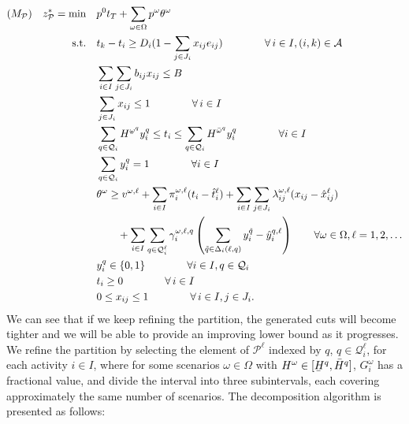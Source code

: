 \documentclass[11pt]{article}
\renewcommand{\underbar}{\underaccent{\bar}}
\begin{document}
	\begin{subequations} \label{prob:masterTightened}
		\begin{align}
		(M_{\mathcal{P}}) \quad z_{\mathcal{P}}^* = \min \quad &p^0 t_T + \sum_{\omega \in \Omega} p^\omega \theta^{\omega}\\
		\text{s.t.} \quad & t_k - t_i \geq D_{i}(1 - \sum_{j \in J_i} x_{ij} e_{ij}) \qquad \qquad \forall \,i \in I, (i,k) \in \mathcal{A} \label{cons:MpSep}\\
		& \sum_{i \in I} \sum_{j \in J_i} b_{ij}x_{ij} \leq B  \label{cons:MpBudget}\\
		& \sum_{j \in J_i} x_{ij} \leq 1  \qquad \qquad \forall \,i \in I \label{cons:MpSingleBudget}\\
		& \sum_{q \in \mathcal{Q}_i} H^{\underbar{\omega}^q} y_i^{q} \leq t_i \leq \sum_{q \in \mathcal{Q}_i} H^{\bar{\omega}^q} y_i^{q} \qquad \qquad \forall i \in I\\
		& \sum_{q \in \mathcal{Q}_i} y^q_i = 1 \qquad \qquad \forall i \in I \label{cons:MpY1}\\
		& \theta^\omega \geq v^{\omega,\ell} + \sum_{i \in I} \pi_i^{\omega,\ell} (t_i - \hat{t}_i^{\ell}) + \sum_{i \in I} \sum_{j \in J_i} \lambda_{ij}^{\omega,\ell} (x_{ij} - \hat{x}_{ij}^{\ell}) \nonumber \\
		&\qquad + \sum_{i \in I} \sum_{q \in \mathcal{Q}^{\ell}_i} \gamma_{i}^{\omega,\ell,q} \left( \sum_{\tilde{q} \in \Delta_i(\ell,q)}y_i^{\tilde{q}} - \hat{y}_i^{q,\ell} \right) \qquad  \forall \omega \in \Omega, \ell = 1, 2, \dots\\
		& y_i^q \in \{0,1\} \qquad \qquad \forall i \in I, q \in \mathcal{Q}_i\\
		& t_i \geq 0 \qquad \qquad \forall \,i \in I\\
		& 0 \leq x_{ij} \leq 1 \qquad \qquad \forall \,i \in I, j \in J_i.
		\end{align}
	\end{subequations}
	We can see that if we keep refining the partition, the generated cuts will become tighter and we will be able to provide an improving lower bound as it progresses. We refine the partition by selecting the element of \(\mathcal{P}^\ell\) indexed by \(q\), \(q \in \mathcal{Q}^\ell_i\), for each activity \(i \in I\), where for some scenarios \(\omega \in \Omega\) with \(H^\omega \in [\underbar{H}^q,\bar{H}^q]\), \(G_i^\omega\) has a fractional value, and divide the interval into three subintervals, each covering approximately the same number of scenarios. The decomposition algorithm is presented as follows:\\
\end{document}
